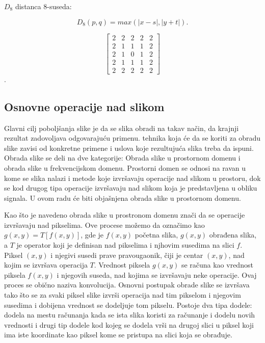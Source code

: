 \documentclass[a4paper,12pt,titlepage]{article}
\begin{document}
$D_{8}$ distanca 8-suseda:

\begin{equation}\label{eq:8ne}
D_{8}(p, q) = max(|x - s|, |y + t|).
\end{equation} 

\[
\begin{bmatrix}
2 & 2 & 2 & 2 & 2 \\
2 & 1 & 1 & 1 & 2 \\
2 & 1 & 0 & 1 & 2 \\
2 & 1 & 1 & 1 & 2 \\
2 & 2 & 2 & 2 & 2 
\end{bmatrix}
\].

\subsection{Osnovne operacije nad slikom}%

Glavni cilj poboljšanja slike je da se slika obradi na takav način, da krajnji rezultat zadovoljava odgovarajuću primenu. tehnika koja će da se koriti za obradu slike zavisi od konkretne primene i uslova koje rezultujuća slika treba da ispuni. Obrada slike se deli na dve kategorije: Obrada slike u prostornom domenu i obrada slike u frekvencijskom domenu. Prostorni domen se odnosi na ravan u kome se slika nalazi i metode koje izvršavaju operacije nad slikom u prostoru, dok se kod drugog tipa operacije izvršavaju nad slikom koja je predstavljena u obliku signala. U ovom radu će biti objašnjena obrada slike u prostornom domenu.

Kao što je navedeno obrada slike u prostronom domenu znači da se operacije izvršavaju nad pikselima. Ove procese možemo da označimo kao $g(x, y) = T[f(x, y)]$, gde je $f(x, y)$ početna slika, $g(x, y)$ obrađena slika, a $T$ je operator koji je definisan nad pikselima i njhovim susedima na slici $f$. Piksel $(x, y)$ i njegivi susedi prave pravougaonik, čiji je centar $(x, y)$, nad kojim se izvršava operacija $T$. Vrednost piksela $g(x, y)$ se računa kao vrednost piksela $f(x, y)$ i njegovih suseda, nad kojima se izvršavaju neke operacije. Ovaj proces se obično naziva konvolucija. Osnovni postupak obrade slike se izvršava tako što se za svaki piksel slike izvrši operacija nad tim pikselom i njegovim susedima i dobijena vrednost se dodeljuje tom pikselu. Postoje dva tipa dodele: dodela na mestu računanja kada se ista slika koristi za računanje i dodelu novih vrednosti i drugi tip dodele kod kojeg se dodela vrši na drugoj slici u piksel koji ima iste koordinate kao piksel kome se pristupa na slici koja se obrađuje. 
\end{document}
